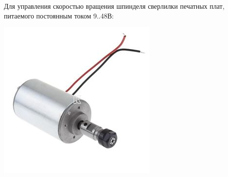 
Для управления скоростью вращения шпинделя сверлилки печатных плат,
питаемого постоянным током 9..48В:

\includegraphics[height=0.7\textheight]{SpindleDriver/spindle.jpeg}

